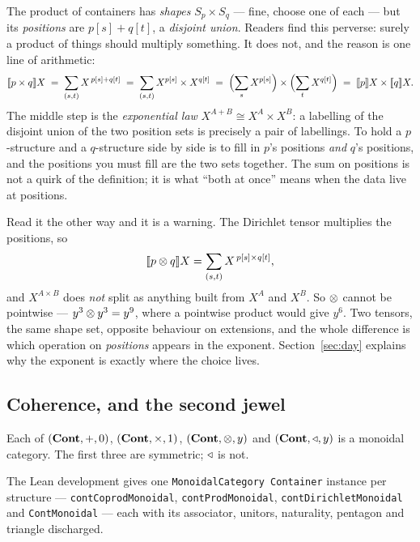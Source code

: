 The product of containers has \emph{shapes} $S_p\times S_q$ --- fine, choose one
of each --- but its \emph{positions} are $p[s]+q[t]$, a \emph{disjoint union}.
Readers find this perverse: surely a product of things should multiply
something. It does not, and the reason is one line of arithmetic:
\[
  \llbracket p\times q \rrbracket X
   \;=\;\sum_{(s,t)} X^{\,p[s]+q[t]}
   \;=\;\sum_{(s,t)} X^{p[s]}\times X^{q[t]}
   \;=\;\Bigl(\sum_s X^{p[s]}\Bigr)\times\Bigl(\sum_t X^{q[t]}\Bigr)
   \;=\;\llbracket p \rrbracket X\times\llbracket q \rrbracket X .
\]
The middle step is the \emph{exponential law} $X^{A+B}\cong X^A\times X^B$: a
labelling of the disjoint union of the two position sets is precisely a pair of
labellings. To hold a $p$-structure and a $q$-structure side by side is to fill
in $p$'s positions \emph{and} $q$'s positions, and the positions you must fill
are the two sets together. The sum on positions is not a quirk of the
definition; it is what ``both at once'' means when the data live at positions.

Read it the other way and it is a warning. The Dirichlet tensor multiplies the
positions, so
\[
  \llbracket p\mathbin{\otimes} q \rrbracket X=\sum_{(s,t)}X^{\,p[s]\times q[t]},
\]
and $X^{A\times B}$ does \emph{not} split as anything built from $X^A$ and
$X^B$. So $\mathbin{\otimes}$ cannot be pointwise --- $y^3\mathbin{\otimes} y^3=y^9$, where a pointwise
product would give $y^6$. Two tensors, the same shape set, opposite behaviour on
extensions, and the whole difference is which operation on \emph{positions}
appears in the exponent. Section~\ref{sec:day} explains why the exponent is
exactly where the choice lives.

\subsection{Coherence, and the second jewel}

\begin{Theorem}\label{thm:fourmonoidal}
Each of $(\mathbf{Cont},+,0)$, $(\mathbf{Cont},\times,1)$, $(\mathbf{Cont},\mathbin{\otimes},y)$ and
$(\mathbf{Cont},\mathbin{\triangleleft},y)$ is a monoidal category. The first three are symmetric; $\mathbin{\triangleleft}$
is not.
\end{Theorem}

The Lean development gives one \texttt{MonoidalCategory Container} instance per
structure --- \texttt{contCoprodMonoidal}, \texttt{contProdMonoidal},
\texttt{contDirichletMonoidal} and \texttt{ContMonoidal} --- each with its
associator, unitors, naturality, pentagon and triangle discharged.

